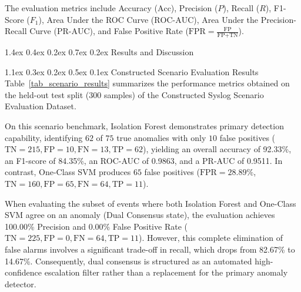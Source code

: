 \documentclass[10pt,conference]{IEEEtran}
\makeatletter
\renewcommand\section{\@startsection{section}{1}{\z@}%
  {1.4ex \@plus 0.4ex \@minus 0.2ex}%
  {0.7ex \@plus 0.2ex}%
  {\normalfont\fontsize{12pt}{14.4pt}\selectfont\bfseries\centering}}
\renewcommand\subsection{\@startsection{subsection}{2}{\z@}%
  {1.1ex \@plus 0.3ex \@minus 0.2ex}%
  {0.5ex \@plus 0.1ex}%
  {\normalfont\fontsize{12pt}{14.4pt}\selectfont\bfseries}}
\makeatother
\begin{document}
The evaluation metrics include Accuracy ($\text{Acc}$), Precision ($P$), Recall ($R$), F1-Score ($F_1$), Area Under the ROC Curve ($\text{ROC-AUC}$), Area Under the Precision-Recall Curve ($\text{PR-AUC}$), and False Positive Rate ($\text{FPR} = \frac{\text{FP}}{\text{FP} + \text{TN}}$).

\section{Results and Discussion}
\label{sec:results}

\subsection{Constructed Scenario Evaluation Results}
Table~\ref{tab_scenario_results} summarizes the performance metrics obtained on the held-out test split ($300$ samples) of the Constructed Syslog Scenario Evaluation Dataset.

\begin{table}[t]
\caption{Performance on Constructed Scenario Test Set (300 Samples)}
\label{tab_scenario_results}
\centering
{}
\end{table}

On this scenario benchmark, Isolation Forest demonstrates primary detection capability, identifying $62$ of $75$ true anomalies with only $10$ false positives ($\text{TN}=215, \text{FP}=10, \text{FN}=13, \text{TP}=62$), yielding an overall accuracy of 92.33\%, an F1-score of 84.35\%, an ROC-AUC of 0.9863, and a PR-AUC of 0.9511. In contrast, One-Class SVM produces $65$ false positives ($\text{FPR} = 28.89\%$, $\text{TN}=160, \text{FP}=65, \text{FN}=64, \text{TP}=11$). 

When evaluating the subset of events where both Isolation Forest and One-Class SVM agree on an anomaly (Dual Consensus state), the evaluation achieves 100.00\% Precision and 0.00\% False Positive Rate ($\text{TN}=225, \text{FP}=0, \text{FN}=64, \text{TP}=11$). However, this complete elimination of false alarms involves a significant trade-off in recall, which drops from 82.67\% to 14.67\%. Consequently, dual consensus is structured as an automated high-confidence escalation filter rather than a replacement for the primary anomaly detector.
\end{document}
